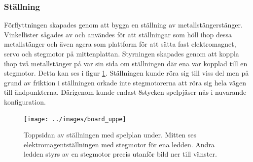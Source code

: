 \documentclass[a4paper]{article}
\begin{document}
\subsubsection*{Ställning}
Förflyttningen skapades genom att bygga en ställning av metallstängerstänger. Vinkellister sågades av och användes för att ställningar som höll ihop dessa metallstänger och även agera som plattform för att sätta fast elektromagnet, servo och stegmotor på mittenplattan. Styrningen skapades genom att koppla ihop två metallstänger på var sin sida om ställningen där ena var kopplad till en stegmotor. Detta kan ses i figur \ref{board_uppe}. Ställningen kunde röra sig till viss del men på grund av friktion i ställningen orkade inte stegmotorerna att röra sig hela vägen till ändpunkterna. Därigenom kunde endast 8stycken spelpjäser nås i nuvarande konfiguration.
\begin{figure}\label{board_uppe}
\centering
\texttt{[image: ../images/board\_uppe]}
\caption{Toppsidan av ställningen med spelplan under. Mitten ses elektromagentställningen med stegmotor för ena ledden. Andra ledden styrs av en stegmotor precis utanför bild ner till vänster.}
\end{figure}
\end{document}
